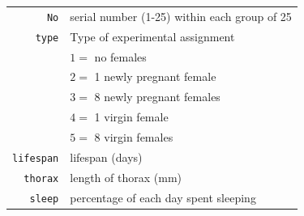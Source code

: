 \documentclass[12pt,letterpaper]{article}
\begin{document}
\begin{tabular}{r|l}
	\texttt{No} & serial number (1-25) within each group of 25\\
	\texttt{type} & Type of experimental assignment \\
	& \hspace{0.1in} $1=$ no females  \\
	& \hspace{0.1in} $2=$ 1 newly pregnant female \\
	& \hspace{0.1in} $3=$ 8 newly pregnant females\\
	& \hspace{0.1in} $4=$ 1 virgin female\\
	& \hspace{0.1in} $5=$ 8 virgin females\\
	\texttt{lifespan} & lifespan (days)\\
	\texttt{thorax} & length of thorax (mm)\\
	\texttt{sleep} & percentage of each day spent sleeping\\
\end{tabular}
\vspace{1cm}
\end{document}
